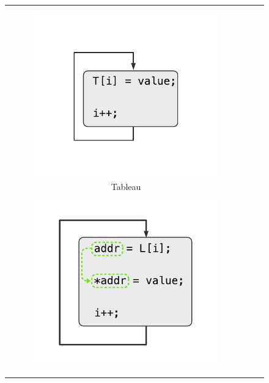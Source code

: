 \begin{figure}
	\begin{tabular}{c c c}
		\begin{subfigure}{0.33 \linewidth}
			\includegraphics[width=\linewidth]{graphics/figures/array-dependencies.pdf}
			\caption{\label{fig:array-deps}Tableau}
		\end{subfigure}
		\begin{subfigure}{0.33 \linewidth}
			\includegraphics[width=\linewidth]{graphics/figures/lookup-dependencies.pdf}

\end{subfigure}
\end{tabular}
\end{figure}
